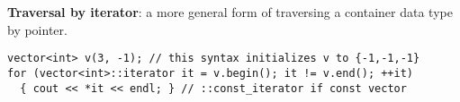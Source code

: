 \documentclass[7pt, twocolumn]{extarticle}
\newcommand{\myinline}[1]{\lstinline[basicstyle={\fontsize{5pt}{6}\ttfamily}]{#1}}
\begin{document}
\begin{small}
\smallskip
\begin{minipage}[h]{3.35cm} 
   \textbf{Traversal by iterator}: a more general form of traversing a container data type by pointer.
    \end{minipage}
   \begin{minipage}[c]{6.9cm}
       \begin{tcolorbox}[top=-5pt,bottom=-5pt,left=-1pt,right=-1pt,boxrule=0.5pt,arc=0pt]
              {
              \begin{lstlisting}[style = mystyle]
vector<int> v(3, -1); // this syntax initializes v to {-1,-1,-1}
for (vector<int>::iterator it = v.begin(); it != v.end(); ++it)
  { cout << *it << endl; } // ::const_iterator if const vector
\end{lstlisting}
}
\end{tcolorbox}
    \end{minipage}




\end{small}
\end{document}
